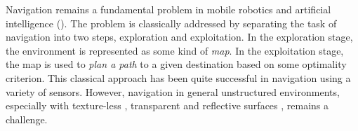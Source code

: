 
Navigation remains a fundamental problem in mobile robotics and artificial intelligence (\cite{SmChIJRR1986,ElCOMPUTER1980}).
The problem is classically addressed by separating the task of navigation into two steps, exploration and exploitation. 
In the exploration stage, the environment is represented as some kind of \emph{map}. 
In the exploitation stage, the map is used to \emph{plan a path} to a given destination based on some optimality criterion. 
This classical approach has been quite successful in navigation using a variety of sensors.
However, navigation in general unstructured environments, especially with texture-less \cite{YaSoKaIROS2016}, transparent and reflective surfaces \cite{lai2011large}, remains a challenge.


